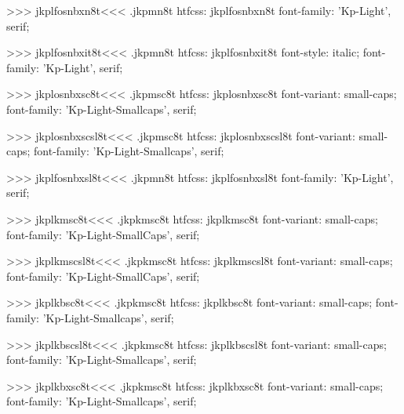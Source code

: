 >>>
\<jkplfosnbxn8t\><<<
.jkpmn8t
htfcss:  jkplfosnbxn8t  font-family: 'Kp-Light', serif;

>>>
\<jkplfosnbxit8t\><<<
.jkpmn8t
htfcss:  jkplfosnbxit8t  font-style: italic; font-family: 'Kp-Light', serif;

>>>
\<jkplosnbxsc8t\><<<
.jkpmsc8t
htfcss:  jkplosnbxsc8t  font-variant: small-caps; font-family: 'Kp-Light-Smallcaps', serif;

>>>
\<jkplosnbxscsl8t\><<<
.jkpmsc8t
htfcss:  jkplosnbxscsl8t  font-variant: small-caps; font-family: 'Kp-Light-Smallcaps', serif;

>>>
\<jkplfosnbxsl8t\><<<
.jkpmn8t
htfcss:  jkplfosnbxsl8t  font-family: 'Kp-Light', serif;

>>>
\<jkplkmsc8t\><<<
.jkpkmsc8t
htfcss:  jkplkmsc8t  font-variant: small-caps; font-family: 'Kp-Light-SmallCaps', serif;

>>>
\<jkplkmscsl8t\><<<
.jkpkmsc8t
htfcss:  jkplkmscsl8t  font-variant: small-caps; font-family: 'Kp-Light-SmallCaps', serif;

>>>
\<jkplkbsc8t\><<<
.jkpkmsc8t
htfcss:  jkplkbsc8t  font-variant: small-caps; font-family: 'Kp-Light-Smallcaps', serif;

>>>
\<jkplkbscsl8t\><<<
.jkpkmsc8t
htfcss:  jkplkbscsl8t  font-variant: small-caps; font-family: 'Kp-Light-Smallcaps', serif;

>>>
\<jkplkbxsc8t\><<<
.jkpkmsc8t
htfcss:  jkplkbxsc8t  font-variant: small-caps; font-family: 'Kp-Light-Smallcaps', serif;

